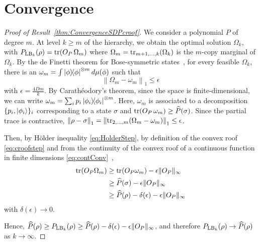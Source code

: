 \documentclass[11pt,a4paper]{report}
\newcounter{reptag}
\newif\iftags \tagsfalse   %
\newcommand{\reptagbox}[3]{\iftags\par\smallskip\noindent\refstepcounter{reptag}%
  \fcolorbox{#1}{#1!7}{\parbox{\dimexpr\linewidth-2\fboxsep-2\fboxrule\relax}{\small
  \textcolor{#1}{\textbf{[\thereptag]\ #2.}}\ #3}}\par\smallskip\fi}
\newcommand{\deeper}[1]{\reptagbox{tagP}{Deeper proof}{#1}}
\begin{document}
\section{Convergence}\label{app:ProofCongNonExtHier}
\begin{proof}[Proof of Result~\ref{thm:ConvergenceSDPcroof}]
We consider a polynomial $P$ of degree $m$. At level $k \geq m$ of the hierarchy, we obtain the optimal solution $\Omega_k$, with $P_{{\rm LB}_k}(\rho) = \tr(O_P\, \Omega_m)$ where $\Omega_m = \tr_{m+1,\dots, k}(\Omega_k)$ is the $m$-copy marginal of $\Omega_k$.
By the de Finetti theorem for Bose-symmetric states~\cite[Thm.~II.8]{Christandl_2007}, for every feasible $\Omega_k$, there is an $\omega_m = \int \dyad{\phi}^{\otimes m} d\mu(\phi)$ such that
\begin{equation}
    \left\|\Omega_m - \omega_m\right\|_1 \leq \epsilon
\end{equation}
with $\epsilon = \tfrac{4 D m}{k}$. By Carath\'eodory's theorem, since the space is finite-dimensional, we can write $\omega_m = \sum_i p_i \dyad{\phi_i}^{\otimes m}$. Here, $\omega_m$ is associated to a decomposition $\{p_i, \ket{\phi_i}\}_i$ corresponding to a state $\sigma$ and $\tr(O_P \,\omega_m) \geq \widehat{P}(\sigma)$. Since the partial trace is contractive, $\left\|\rho - \sigma\right\|_1 = \left\|\tr_{2,\dots, m}(\Omega_m - \omega_m)\right\|_1 \leq \epsilon$.

Then, by H\"{o}lder inequality \eqref{eq:HolderStep}, by definition of the convex roof \eqref{eq:croofstep} and from the continuity of the convex roof of a continuous function in finite dimensions \eqref{eq:contConv}~\cite[Thm.~6.1]{Bucicovschi2013},
\begin{align}
    \tr(O_P \Omega_m) &\geq \tr(O_P\omega_m) - \epsilon\|O_P\|_\infty \label{eq:HolderStep}\\
    &\geq \widehat{P}(\sigma) - \epsilon\|O_P\|_\infty \label{eq:croofstep}\\
    &\geq \widehat{P}(\rho) - \delta(\epsilon) - \epsilon\|O_P\|_\infty \label{eq:contConv}
\end{align}
with $\delta(\epsilon) \to 0$.

Hence, $\widehat{P}{(\rho)} \geq P_{{\rm LB}_k}(\rho) \geq \widehat{P}{(\rho)} -\delta(\epsilon) - \epsilon\|O_P\|_\infty$, and therefore $P_{{\rm LB}_k}(\rho) \to \widehat{P}(\rho)$ as $k \to \infty$.
\end{proof}
\deeper{This is the main theorem; expand the proof. State the de Finetti theorem precisely (hypotheses, norm, constant) and check $\epsilon=4Dm/k$ against Ref.~\cite{Christandl_2007}, with $D=d_Ad_B$ as the single-copy dimension and $\Omega_k$ normalised by the marginal constraint. Explain why Carath\'eodory turns the integral into a finite sum. State the continuity theorem of Ref.~\cite{Bucicovschi2013} that you use. Bound $\|O_P\|_\infty\le\max_\lambda|c_\lambda|/f^\lambda$ (the $\Pi^\lambda$ are orthogonal). If possible, give an explicit rate in $k$ for one measure, e.g.\ the linear entropy, using an explicit continuity bound for its convex roof.}
\end{document}
